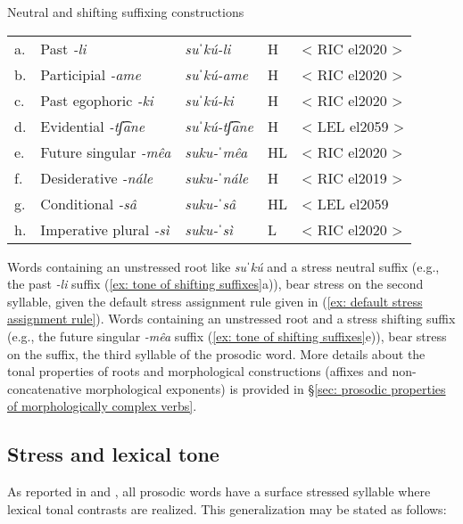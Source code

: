 \ea\label{ex: tone of shifting suffixes}
{Neutral and shifting suffixing constructions}\\

\begin{tabular}{lllll}
     a. & {Past \textit{-li}} & {\textit{suˈkú-li}} & {H} & < RIC el2020 >\\
     b. & {Participial \textit{-ame}} & {\textit{suˈkú-ame}} &{H}  & < RIC el2020 >\\
     c. & {Past egophoric \textit{-ki}}&{\textit{suˈkú-ki}}&{H}&{< RIC el2020 >}\\
     d. & {Evidential \textit{-tʃ͡ane}}&{\textit{suˈkú-tʃ͡ane}}&{H}&{< LEL el2059 >}\\
    e. & {Future singular \textit{-mêa}}&{\textit{suku-ˈmêa}}&{HL}&{< RIC el2020 >}\\
    f. & Desiderative \textit{-nále}&{\textit{suku-ˈnále}}&{H}&{< RIC el2019 >}\\
    g.& {Conditional \textit{-sâ}}&{\textit{suku-ˈsâ}}&{HL}&{< LEL el2059}\\
    h. & {Imperative plural \textit{-sì}}&{\textit{suku-ˈsì}}&{L}&{< RIC el2020 >}
    \end{tabular}
      \z

Words containing an unstressed root like \textit{suˈkú} and a stress neutral suffix (e.g., the past \textit{-li} suffix (\ref{ex: tone of shifting suffixes}a)), bear stress on the second syllable, given the default stress assignment rule given in (\ref{ex: default stress assignment rule}). Words containing an unstressed root and a stress shifting suffix (e.g., the future singular \textit{-mêa} suffix (\ref{ex: tone of shifting suffixes}e)), bear stress on the suffix, the third syllable of the prosodic word. More details about the tonal properties of roots and morphological constructions (affixes and non-concatenative morphological exponents) is provided in §\ref{sec: prosodic properties of morphologically complex verbs}.

\subsection{Stress and lexical tone}
\label{subsec: stress and lexical tone}

As reported in  and , all prosodic words have a surface stressed syllable where lexical tonal contrasts are realized. This generalization may be stated as follows:

